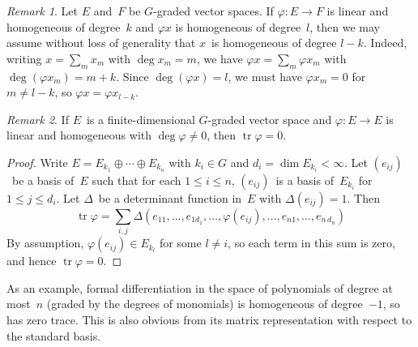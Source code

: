 \documentclass[letterpaper,12pt]{article}
\DeclareMathOperator{\tr}{tr}
\newcommand{\dsum}{\oplus}
\newcommand{\multi}[4]{#2_{#3}#1\cdots#1#2_{#4}}
\newcommand{\dsums}[3]{\multi{\dsum}{#1}{#2}{#3}}
\theoremstyle{definition}
\theoremstyle{remark}
\newtheorem*{rmk}{Remark}
\begin{document}
\begin{rmk}
Let \(E\) and~\(F\) be \(G\)-graded vector spaces. If \(\varphi:E\to F\) is linear and homogeneous of degree~\(k\) and \(\varphi x\) is homogeneous of degree~\(l\), then we may assume without loss of generality that \(x\)~is homogeneous of degree \(l-k\). Indeed, writing \(x=\sum_m x_m\) with \(\deg x_m=m\), we have \(\varphi x=\sum_m\varphi x_m\) with \(\deg(\varphi x_m)=m+k\). Since \(\deg(\varphi x)=l\), we must have \(\varphi x_m=0\) for \(m\ne l-k\), so \(\varphi x=\varphi x_{l-k}\).
\end{rmk}

\begin{rmk}
If \(E\)~is a finite-dimensional \(G\)-graded vector space and \(\varphi:E\to E\) is linear and homogeneous with \(\deg\varphi\ne 0\), then \(\tr\varphi=0\).
\end{rmk}
\begin{proof}
Write \(E=\dsums{E}{k_1}{k_n}\) with \(k_i\in G\) and \(d_i=\dim E_{k_i}<\infty\). Let \((e_{ij})\)~be a basis of~\(E\) such that for each \(1\le i\le n\), \((e_{ij})\)~is a basis of~\(E_{k_i}\) for \(1\le j\le d_i\). Let \(\Delta\)~be a determinant function in~\(E\) with \(\Delta(e_{ij})=1\). Then
\[\tr\varphi=\sum_{i,j}\Delta(e_{11},\ldots,e_{1d_1},\ldots,\varphi(e_{ij}),\ldots,e_{n1},\ldots,e_{n\,d_n})\]
By assumption, \(\varphi(e_{ij})\in E_{k_l}\) for some \(l\ne i\), so each term in this sum is zero, and hence \(\tr\varphi=0\).
\end{proof}
\noindent As an example, formal differentiation in the space of polynomials of degree at most~\(n\) (graded by the degrees of monomials) is homogeneous of degree~\(-1\), so has zero trace. This is also obvious from its matrix representation with respect to the standard basis.
\end{document}

